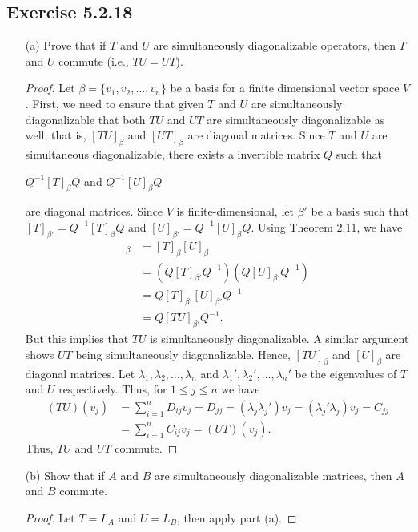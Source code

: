 \subsection*{Exercise 5.2.18} 
\begin{enumerate}
    \item[(a)] Prove that if \( T  \) and \( U  \) are simultaneously diagonalizable operators, then \( T  \) and \( U  \) commute (i.e., \( TU = UT \)). 
        \begin{proof}
        Let \( \beta = \{ {v}_{1}, {v}_{2}, \dots ,{v}_{n} \}  \) be a basis for a finite dimensional vector space \( V  \). First, we need to ensure that given \( T \) and \( U  \) are simultaneously diagonalizable that both \( TU \) and \( UT  \) are simultaneously diagonalizable as well; that is, \( [TU]_{\beta} \) and \( [UT]_{\beta} \) are diagonal matrices. Since \( T \) and \( U  \) are simultaneous diagonalizable, there exists a invertible matrix \( Q  \) such that  
        \begin{center}
            \( Q^{-1}[T]_{\beta} Q \) and \( Q^{-1} [U]_{\beta} Q  \) 
        \end{center}
        are diagonal matrices. Since \( V  \) is finite-dimensional, let \( \beta'  \) be a basis such that \( [T]_{\beta'} = Q^{-1} [T]_{\beta}  Q  \) and \( [U]_{\beta'} = Q^{-1} [U]_{\beta} Q  \). Using Theorem 2.11, we have
        \begin{align*}
            [TU]_{\beta} &= [T]_{\beta} [U]_{\beta} \\
                         &= (Q [T]_{\beta'} Q^{-1})(Q [U]_{\beta'} Q^{-1}) \\
                         &= Q [T]_{\beta'} [U]_{\beta'} Q^{-1} \\
                         &= Q [TU]_{\beta'} Q^{-1}.
        \end{align*}
        But this implies that \( TU \) is simultaneously diagonalizable. A similar argument shows \( UT  \) being simultaneously diagonalizable. Hence, \( [TU]_{\beta} \) and \( [U]_{\beta} \) are diagonal matrices. Let \( {\lambda}_{1}, {\lambda}_{2}, \dots, {\lambda}_{n} \) and \( {\lambda}_{1}', {\lambda}_{2}', \dots, {\lambda}_{n}'  \) be the eigenvalues of   \( T  \) and \( U  \) respectively. Thus, for \( 1 \leq j \leq n  \) we have
        \begin{align*}
            (TU)({v}_{j}) &=  \sum_{ i=1 }^{ n } {D}_{ij} {v}_{j} = {D}_{jj} 
                          = ({\lambda}_{j} {\lambda}_{j}') {v}_{j} 
                          = ({\lambda}_{j}'{\lambda}_{j}) {v}_{j} =  {C}_{jj} \\
                          &= \sum_{ i=1 }^{ n } {C}_{ij} {v}_{j} = (UT)({v}_{j}).
        \end{align*}
        Thus, \( TU \) and \( UT  \) commute. 
        \end{proof}
    \item[(b)] Show that if \( A  \) and \( B  \) are simultaneously diagonalizable matrices, then \( A  \) and \( B  \) commute.
        \begin{proof}
        Let \( T = {L}_{A} \) and \( U = {L}_{B} \), then apply part (a).
        \end{proof}
\end{enumerate}


